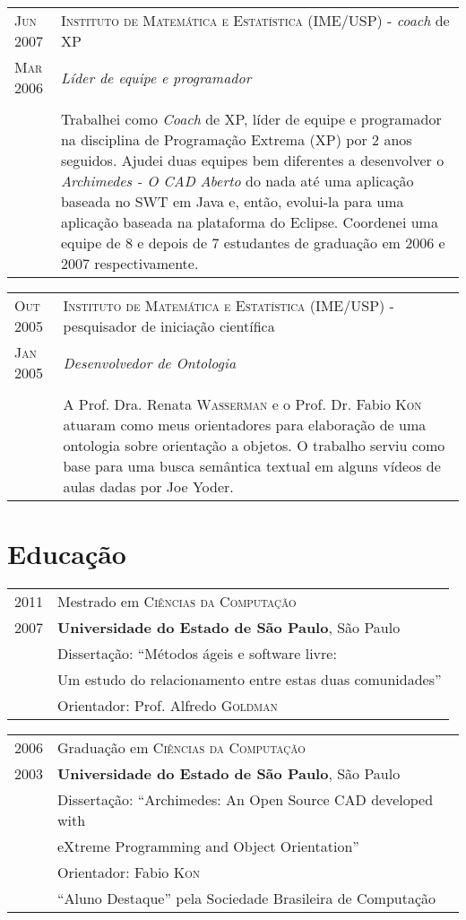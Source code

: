 \documentclass[letter,10pt]{article}
\begin{document}
\begin{tabular}{p{2.5cm}|p{13.5cm}}
  \textsc{Jun 2007} & \textsc{Instituto de Matemática e Estatística
    (IME/USP)} - \textit{coach} de XP\\
  \textsc{Mar 2006}& \emph{Líder de equipe e programador}\\
  &\\
  &  Trabalhei como \textit{Coach} de XP, líder de equipe e
  programador na disciplina de Programação Extrema (XP) por 2 anos
  seguidos. Ajudei duas equipes bem diferentes a desenvolver o
  \emph{Archimedes - O CAD Aberto}  do nada até uma aplicação baseada
  no SWT em Java e, então, evolui-la para uma aplicação baseada na
  plataforma do Eclipse. Coordenei uma equipe de 8 e depois de 7
  estudantes de graduação em 2006 e 2007 respectivamente.
\end{tabular}

\begin{tabular}{p{2.5cm}|p{13.5cm}}
  \textsc{Out 2005} & \textsc{Instituto de Matemática e Estatística
    (IME/USP)} - pesquisador de iniciação científica\\
  \textsc{Jan 2005}& \emph{Desenvolvedor de Ontologia}\\
  &\\
  & A Prof. Dra. Renata \textsc{Wasserman} e o Prof. Dr. Fabio
  \textsc{Kon} atuaram como meus orientadores para elaboração de uma
  ontologia sobre orientação a objetos. O trabalho serviu como base
  para uma busca semântica textual em alguns vídeos de aulas dadas por
  Joe Yoder.
\end{tabular}

\section{Educação}
\begin{tabular}{p{2.5cm}l}
  \textsc{2011} & Mestrado em \textsc{Ciências da Computação}\\
  \textsc{2007} & \textbf{Universidade do Estado de São Paulo}, São Paulo\\
  & Dissertação: ``Métodos ágeis e software livre:\\
  & Um estudo do relacionamento entre estas duas comunidades''\\
  & \small Orientador: Prof. Alfredo \textsc{Goldman}\\
\end{tabular}

\begin{tabular}{p{2.5cm}l}
  \textsc{2006} & Graduação em \textsc{Ciências da Computação}\\
  \textsc{2003} &\normalsize\textbf{Universidade do Estado de São Paulo}, São Paulo\\
  & Dissertação: ``Archimedes: An Open Source CAD developed with\\
  & eXtreme Programming and Object Orientation''\\
  & \small Orientador: Fabio \textsc{Kon}\\
  & ``Aluno Destaque'' pela Sociedade Brasileira de Computação\\
\end{tabular}
\end{document}
